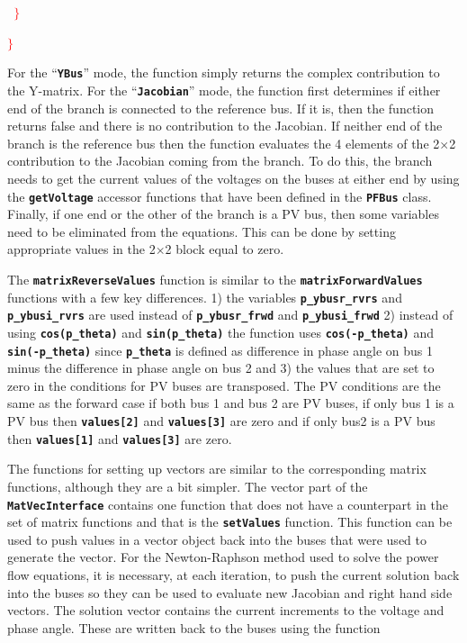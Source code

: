 \documentclass[12pt]{report} %
\begin{document}
\textcolor{red}{\texttt{\textbf{  $\boldsymbol{\mathrm{\}}}$}}}

\textcolor{red}{\texttt{\textbf{$\boldsymbol{\mathrm{\}}}$}}}

For the ``\texttt{\textbf{YBus}}'' mode, the function simply returns the complex contribution to the Y-matrix. For the ``\texttt{\textbf{Jacobian}}'' mode, the function first determines if either end of the branch is connected to the reference bus. If it is, then the function returns false and there is no contribution to the Jacobian. If neither end of the branch is the reference bus then the function evaluates the 4 elements of the 2$\mathrm{\times}$2 contribution to the Jacobian coming from the branch. To do this, the branch needs to get the current values of the voltages on the buses at either end by using the \texttt{\textbf{getVoltage}} accessor functions that have been defined in the \texttt{\textbf{PFBus}} class. Finally, if one end or the other of the branch is a PV bus, then some variables need to be eliminated from the equations. This can be done by setting appropriate values in the 2$\mathrm{\times}$2 block equal to zero.

The \texttt{\textbf{matrixReverseValues}} function is similar to the \texttt{\textbf{matrixForwardValues}} functions with a few key differences. 1) the variables \texttt{\textbf{p\_ybusr\_rvrs}} and \texttt{\textbf{p\_ybusi\_rvrs}} are used instead of \texttt{\textbf{p\_ybusr\_frwd}} and \texttt{\textbf{p\_ybusi\_frwd}} 2) instead of using \texttt{\textbf{cos(p\_theta)}} and \texttt{\textbf{sin(p\_theta)}} the function uses \texttt{\textbf{cos(-p\_theta)}} and \texttt{\textbf{sin(-p\_theta)}} since \texttt{\textbf{p\_theta}} is defined as difference in phase angle on bus 1 minus the difference in phase angle on bus 2 and 3) the values that are set to zero in the conditions for PV buses are transposed. The PV conditions are the same as the forward case if both bus 1 and bus 2 are PV buses, if only bus 1 is a PV bus then \texttt{\textbf{values[2]}} and \texttt{\textbf{values[3]}} are zero and if only bus2 is a PV bus then \texttt{\textbf{values[1]}} and \texttt{\textbf{values[3]}} are zero.

The functions for setting up vectors are similar to the corresponding matrix functions, although they are a bit simpler. The vector part of the \texttt{\textbf{MatVecInterface}} contains one function that does not have a counterpart in the set of matrix functions and that is the \texttt{\textbf{setValues}} function. This function can be used to push values in a vector object back into the buses that were used to generate the vector. For the Newton-Raphson method used to solve the power flow equations, it is necessary, at each iteration, to push the current solution back into the buses so they can be used to evaluate new Jacobian and right hand side vectors. The solution vector contains the current increments to the voltage and phase angle. These are written back to the buses using the function
\end{document}
